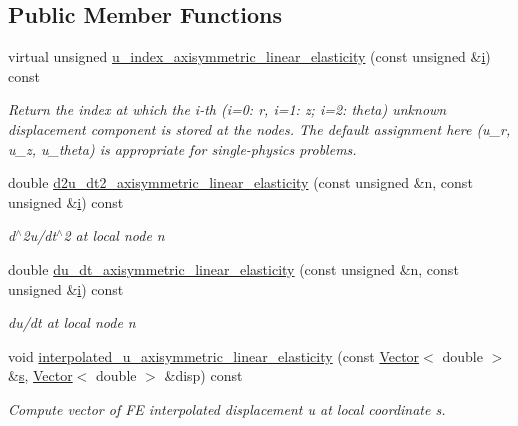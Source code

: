\subsection*{Public Member Functions}
\begin{DoxyCompactItemize}
\item 
virtual unsigned \hyperlink{classoomph_1_1AxisymmetricLinearElasticityEquationsBase_a89f40d1bc15ebc4128ea8a22032d31f5}{u\+\_\+index\+\_\+axisymmetric\+\_\+linear\+\_\+elasticity} (const unsigned \&\hyperlink{cfortran_8h_adb50e893b86b3e55e751a42eab3cba82}{i}) const
\begin{DoxyCompactList}\small\item\em Return the index at which the i-\/th (i=0\+: r, i=1\+: z; i=2\+: theta) unknown displacement component is stored at the nodes. The default assignment here (u\+\_\+r, u\+\_\+z, u\+\_\+theta) is appropriate for single-\/physics problems. \end{DoxyCompactList}\item 
double \hyperlink{classoomph_1_1AxisymmetricLinearElasticityEquationsBase_a352c704cb283b27e5c4d8549f5e380d7}{d2u\+\_\+dt2\+\_\+axisymmetric\+\_\+linear\+\_\+elasticity} (const unsigned \&n, const unsigned \&\hyperlink{cfortran_8h_adb50e893b86b3e55e751a42eab3cba82}{i}) const
\begin{DoxyCompactList}\small\item\em d$^\wedge$2u/dt$^\wedge$2 at local node n \end{DoxyCompactList}\item 
double \hyperlink{classoomph_1_1AxisymmetricLinearElasticityEquationsBase_aa340a3d1068cb5f65ebbfabf1bf07b1e}{du\+\_\+dt\+\_\+axisymmetric\+\_\+linear\+\_\+elasticity} (const unsigned \&n, const unsigned \&\hyperlink{cfortran_8h_adb50e893b86b3e55e751a42eab3cba82}{i}) const
\begin{DoxyCompactList}\small\item\em du/dt at local node n \end{DoxyCompactList}\item 
void \hyperlink{classoomph_1_1AxisymmetricLinearElasticityEquationsBase_afeb2209aa0968aed5fa1ac59bc942991}{interpolated\+\_\+u\+\_\+axisymmetric\+\_\+linear\+\_\+elasticity} (const \hyperlink{classoomph_1_1Vector}{Vector}$<$ double $>$ \&\hyperlink{cfortran_8h_ab7123126e4885ef647dd9c6e3807a21c}{s}, \hyperlink{classoomph_1_1Vector}{Vector}$<$ double $>$ \&disp) const
\begin{DoxyCompactList}\small\item\em Compute vector of FE interpolated displacement u at local coordinate s. \end{DoxyCompactList}\item 

\end{DoxyCompactItemize}
